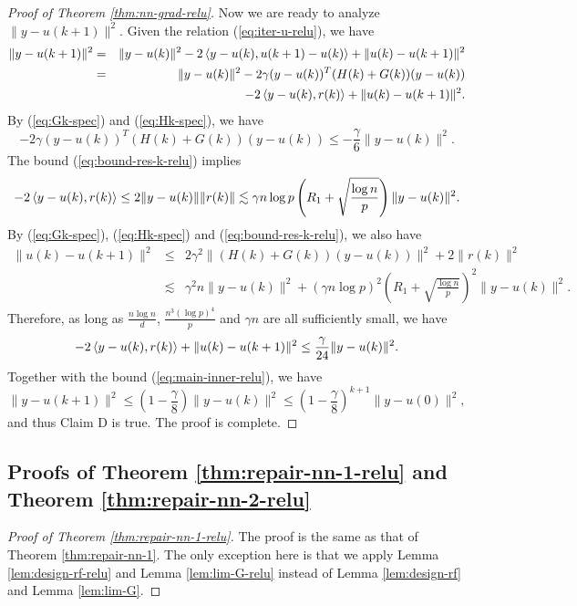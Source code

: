 \begin{proof}[Proof of Theorem \ref{thm:nn-grad-relu}]
Now we are ready to analyze $\|y-u(k+1)\|^2$. Given the relation (\ref{eq:iter-u-relu}), we have
\begin{eqnarray*}
\|y-u(k+1)\|^2 &=& \|y-u(k)\|^2 - 2\iprod{y-u(k)}{u(k+1)-u(k)} + \|u(k)-u(k+1)\|^2 \\
&=& \|y-u(k)\|^2 - 2\gamma(y-u(k))^T(H(k)+G(k))(y-u(k)) \\
&& - 2\iprod{y-u(k)}{r(k)} + \|u(k)-u(k+1)\|^2.
\end{eqnarray*}
By (\ref{eq:Gk-spec}) and (\ref{eq:Hk-spec}), we have
\begin{equation}
- 2\gamma(y-u(k))^T(H(k)+G(k))(y-u(k)) \leq -\frac{\gamma}{6}\|y-u(k)\|^2. \label{eq:main-inner-relu}
\end{equation}
The bound (\ref{eq:bound-res-k-relu}) implies
$$- 2\left \langle y-u(k), r(k) \right\rangle\leq 2\|y-u(k)\|\|r(k)\|\lesssim \gamma n\log p\left(R_1+\sqrt{\frac{\log n}{p}}\right)\|y-u(k)\|^2.$$
By (\ref{eq:Gk-spec}), (\ref{eq:Hk-spec}) and (\ref{eq:bound-res-k-relu}), we also have
\begin{eqnarray*}
\|u(k)-u(k+1)\|^2 &\leq& 2\gamma^2\|(H(k)+G(k))(y-u(k))\|^2 + 2\|r(k)\|^2 \\
&\lesssim& \gamma^2n\|y-u(k)\|^2 + (\gamma n\log p)^2\left(R_1+\sqrt{\frac{\log n}{p}}\right)^2\|y-u(k)\|^2 .
\end{eqnarray*}
Therefore, as long as $\frac{n\log n}{d}$, $\frac{n^3(\log p)^4}{p}$ and $\gamma n$ are all sufficiently small, we have
$$- 2\left \langle y-u(k), r(k) \right\rangle + \|u(k)-u(k+1)\|^2 \leq \frac{\gamma}{24}\|y-u(k)\|^2.$$
Together with the bound (\ref{eq:main-inner-relu}), we have
$$\|y-u(k+1)\|^2 \leq \left(1-\frac{\gamma}{8}\right)\|y-u(k)\|^2\leq \left(1-\frac{\gamma}{8}\right)^{k+1}\|y-u(0)\|^2,$$
and thus Claim D is true. The proof is complete.
\end{proof}


\subsection{Proofs of Theorem \ref{thm:repair-nn-1-relu} and Theorem \ref{thm:repair-nn-2-relu}}

\begin{proof}[Proof of Theorem \ref{thm:repair-nn-1-relu}]
The proof is the same as that of Theorem \ref{thm:repair-nn-1}. The only exception here is that we apply Lemma \ref{lem:design-rf-relu} and Lemma \ref{lem:lim-G-relu} instead of Lemma \ref{lem:design-rf} and Lemma \ref{lem:lim-G}.
\end{proof}

